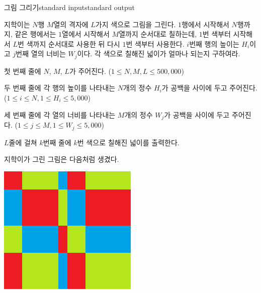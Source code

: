 \begin{problem}{그림 그리기}{standard input}{standard output}

지학이는 $N$행 $M$열의 격자에 $L$가지 색으로 그림을 그린다. $1$행에서 시작해서 $N$행까지, 같은 행에서는 $1$열에서 시작해서 $M$열까지 순서대로 칠하는데, $1$번 색부터 시작해서 $L$번 색까지 순서대로 사용한 뒤 다시 $1$번 색부터 사용한다. $i$번째 행의 높이는 $H_i$이고 $j$번째 열의 너비는 $W_j$이다. 각 색으로 칠해진 넓이가 얼마나 되는지 구하여라.

\InputFile
첫 번째 줄에 $N$, $M$, $L$가 주어진다. ($1 \le N, M, L \le 500,000$)

두 번째 줄에 각 행의 높이를 나타내는 $N$개의 정수 $H_i$가 공백을 사이에 두고 주어진다. ($1 \le i \le N, 1 \le H_i \le 5,000$)

세 번째 줄에 각 열의 너비를 나타내는 $M$개의 정수 $W_j$가 공백을 사이에 두고 주어진다. ($1 \le j \le M, 1 \le W_j \le 5,000$)

\OutputFile
$L$줄에 걸쳐 $k$번째 줄에 $k$번 색으로 칠해진 넓이를 출력한다.

\Example

\begin{example}
%
\end{example}

\Notes

지학이가 그린 그림은 다음처럼 생겼다.

\begin{center}
  \includegraphics[width=0.5\textwidth]{picture.png}
\end{center}

\end{problem}

